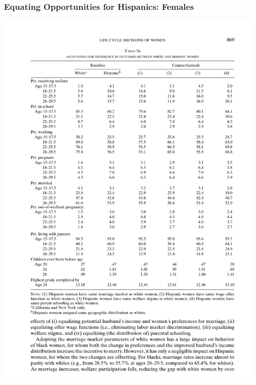 \begin{frame}
	\frametitle{Equating Opportunities for Hispanics: Females}
		\includegraphics[width=\textwidth]{tab-figs/table5b_2010_header} \\

\end{frame}
